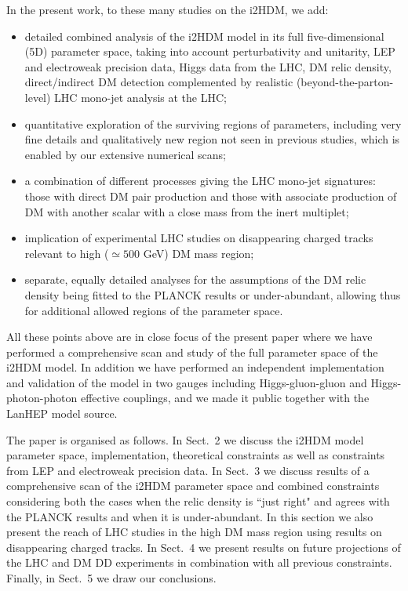 \documentclass[12pt,a4paper]{article}
\begin{document}
In the present work, to these many 
studies on the i2HDM, we add:
\begin{itemize}
\item detailed combined analysis of the i2HDM model in its full five-dimensional (5D)  parameter space, taking
into account perturbativity and unitarity,
LEP and electroweak precision data, Higgs data from the LHC, DM relic density, direct/indirect DM detection 
complemented by realistic (beyond-the-parton-level) LHC mono-jet analysis at the LHC;
\item
quantitative exploration of the surviving regions of parameters, including very fine details  and 
qualitatively new region not seen in previous studies,
which is enabled by our extensive numerical scans;
\item
a combination of different processes giving the LHC mono-jet signatures: 
those with direct DM pair production and those with associate production of DM with another scalar with a close mass
from the inert multiplet;
\item 
implication of experimental LHC studies on disappearing
charged tracks relevant to high ($\simeq 500$ GeV) DM mass region;
\item 
separate, equally detailed analyses for the assumptions of the DM relic density being fitted to the PLANCK results
or under-abundant, allowing thus for additional allowed regions of the parameter space.
\end{itemize}
All these points above are in close focus of the present paper where we have performed a comprehensive  
scan and study of the  full parameter space of the i2HDM model. 
In addition we have performed an independent implementation and validation of the model in two gauges 
including Higgs-gluon-gluon and Higgs-photon-photon effective couplings, and we made it public together with the LanHEP model source.

The paper is organised as follows. 
In Sect.~2 we discuss the i2HDM model parameter space, implementation, 
theoretical constraints as well as constraints from LEP and electroweak precision data.
In Sect.~3 we discuss results of a comprehensive scan of the i2HDM parameter space
and combined constraints considering both the cases when the relic density is ``just right"
and agrees with the PLANCK results and when it is under-abundant.
In this section we also present the reach of  LHC studies in the high DM mass region using
results on disappearing charged tracks.
In Sect.~4 we present results on future projections of the LHC and DM DD experiments
in combination with all previous constraints. Finally, in Sect.~5 we draw our conclusions.
%
\end{document}
